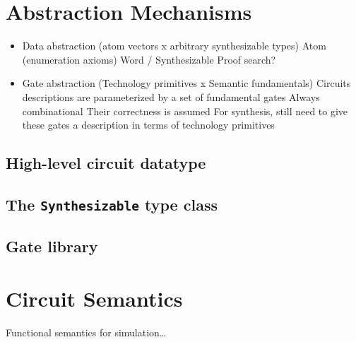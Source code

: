     \section{Abstraction Mechanisms}
    \label{sec:circuit-abstraction}
        \begin{itemize}
            \item Data abstraction (atom vectors x arbitrary synthesizable types)
                \subitem Atom (enumeration axioms)
                \subitem Word / Synthesizable
                    \subsubitem Proof search?
            \item Gate abstraction (Technology primitives x Semantic fundamentals)
                \subitem Circuits descriptions are parameterized by a set of fundamental gates
                    \subsubitem Always combinational
                    \subsubitem Their correctness is assumed
                \subitem For synthesis, still need to give these gates a description in terms of technology primitives
        \end{itemize}


        \subsection{High-level circuit datatype}
        \label{subsec:high-level-circuit}

        \subsection{The \texttt{Synthesizable} type class}
        \label{subsec:synthesizable}

        \subsection{Gate library}
        \label{subsec:gate-library}


    \section{Circuit Semantics}
    \label{sec:circuit-semantics}
        Functional semantics for simulation\ldots


